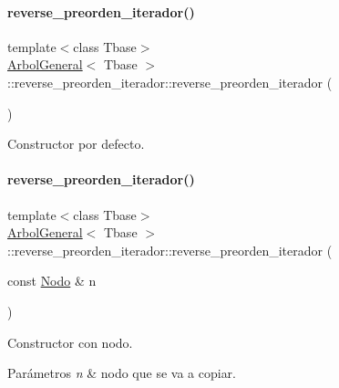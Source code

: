 \paragraph{\texorpdfstring{reverse\+\_\+preorden\+\_\+iterador()}{reverse\_preorden\_iterador()}\hspace{0.1cm}{\footnotesize\ttfamily [1/3]}}
{\footnotesize\ttfamily template$<$class Tbase$>$ \\
\hyperlink{classArbolGeneral}{Arbol\+General}$<$ Tbase $>$\+::reverse\+\_\+preorden\+\_\+iterador\+::reverse\+\_\+preorden\+\_\+iterador (\begin{DoxyParamCaption}{ }\end{DoxyParamCaption})\hspace{0.3cm}{\ttfamily [inline]}}



Constructor por defecto. 

\hypertarget{classArbolGeneral_1_1reverse__preorden__iterador_aab2e21080ac46472a8a5a572c3b79ca9}{}\label{classArbolGeneral_1_1reverse__preorden__iterador_aab2e21080ac46472a8a5a572c3b79ca9} 
\paragraph{\texorpdfstring{reverse\+\_\+preorden\+\_\+iterador()}{reverse\_preorden\_iterador()}\hspace{0.1cm}{\footnotesize\ttfamily [2/3]}}
{\footnotesize\ttfamily template$<$class Tbase$>$ \\
\hyperlink{classArbolGeneral}{Arbol\+General}$<$ Tbase $>$\+::reverse\+\_\+preorden\+\_\+iterador\+::reverse\+\_\+preorden\+\_\+iterador (\begin{DoxyParamCaption}\item[{const \hyperlink{classArbolGeneral_a12cc1b74a9095d89bc7334290d332f7a}{Nodo} \&}]{n }\end{DoxyParamCaption})\hspace{0.3cm}{\ttfamily [inline]}}



Constructor con nodo. 


\begin{DoxyParams}{Parámetros}
{\em n} & nodo que se va a copiar. \\
\hline
\end{DoxyParams}
\hypertarget{classArbolGeneral_1_1reverse__preorden__iterador_a0fb07f7fb272f8257a912e1941d06f40}{}\label{classArbolGeneral_1_1reverse__preorden__iterador_a0fb07f7fb272f8257a912e1941d06f40} 
